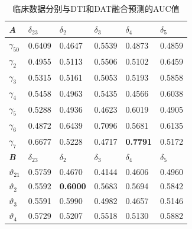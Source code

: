\begin{table}[htbp]
\centering
\caption{临床数据分别与DTI和DAT融合预测的AUC值}
\label{paper5cmfDifferFeature_AUC}
\begin{tabular}{|p{1.1cm}<{\centering}|p{1.8cm}<{\centering}p{1.8cm}<{\centering}p{1.8cm}<{\centering}p{1.8cm}<{\centering}p{1.8cm}<{\centering}|}
\hline
 \textit{\textbf{A}} & $\delta_{23}$         & $\delta_2$                   & $\delta_3$          & $\delta_4$                   & $\delta_5$          \\ \hline 
\textbf{$\gamma_{50}$}               &  0.6409   &  0.4647          &  0.5539  &  0.4873          &  0.4859  \\
\textbf{$\gamma_2$}                &  0.4955   &  0.5113          &  0.5506  &  0.5102          &  0.6459  \\
\textbf{$\gamma_3$}                &  0.5315   &  0.5161          &  0.5053  &  0.5193          &  0.5858  \\
\textbf{$\gamma_4$}                &  0.5458   &  0.4963          &  0.5435  &  0.4566          &  0.6038  \\
\textbf{$\gamma_5$}                &  0.5288   &  0.4936          &  0.4623  &  0.6019          &  0.4905  \\
\textbf{$\gamma_6$}                &  0.4872   &  0.6439          &  0.7096  &  0.5681          &  0.6135  \\
\textbf{$\gamma_7$}                &  0.6677   &  0.5228          &  0.4717  &  \textbf{0.7791} &  0.5172  \\ \hline
 \textit{\textbf{B}}  & $\delta_{23}$         & $\delta_2$                   & $\delta_3$          & $\delta_4$                   & $\delta_5$   \\ \hline 
\textbf{$\vartheta_{21}$}               &  0.5759   &  0.4670          &  0.4144  &  0.4606          &  0.4960  \\
\textbf{$\vartheta_2$}                &  0.5592   &  \textbf{0.6000} &  0.5683  &  0.5694          &  0.5842  \\
\textbf{$\vartheta_3$}                &  0.5591   &  0.5990          &  0.4982  &  0.4657          &  0.5146  \\
\textbf{$\vartheta_4$}                &  0.5729   &  0.5207          &  0.5518  &  0.5130          &  0.5882      \\
\hline 
\end{tabular}
\end{table}

